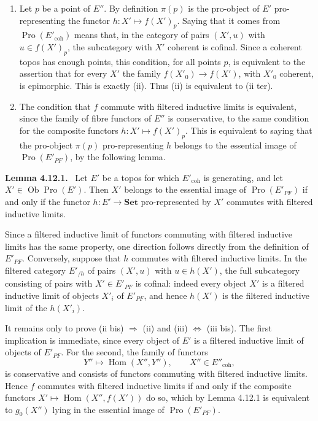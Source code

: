 \documentclass[11pt]{article}
\newcommand{\Ens}{\mathbf{Set}}
\newcommand{\Hom}{\operatorname{Hom}}
\newcommand{\Ob}{\operatorname{Ob}}
\newcommand{\Pro}{\operatorname{Pro}}
\newcommand{\coh}{\mathrm{coh}}
\newenvironment{statement}[1]{\par\medskip\noindent\textbf{#1.}\ }{\par\medskip}
\begin{document}
\begin{enumerate}[label=\alph*)]
\item Let \(p\) be a point of \(E''\). By definition \(\pi(p)\) is the pro-object of \(E'\) pro-representing the functor \(h:X'\mapsto f(X')_p\). Saying that it comes from \(\Pro(E'_{\coh})\) means that, in the category of pairs \((X',u)\) with \(u\in f(X')_p\), the subcategory with \(X'\) coherent is cofinal. Since a coherent topos has enough points, this condition, for all points \(p\), is equivalent to the assertion that for every \(X'\) the family \(f(X'_0)\to f(X')\), with \(X'_0\) coherent, is epimorphic. This is exactly (ii). Thus (ii) is equivalent to (ii ter).

\item The condition that \(f\) commute with filtered inductive limits is equivalent, since the family of fibre functors of \(E''\) is conservative, to the same condition for the composite functors \(h:X'\mapsto f(X')_p\). This is equivalent to saying that the pro-object \(\pi(p)\) pro-representing \(h\) belongs to the essential image of \(\Pro(E'_{PF})\), by the following lemma.
\end{enumerate}

\begin{statement}{Lemma 4.12.1}
Let \(E'\) be a topos for which \(E'_{\coh}\) is generating, and let \(X'\in\Ob\Pro(E')\). Then \(X'\) belongs to the essential image of \(\Pro(E'_{PF})\) if and only if the functor \(h:E'\to\Ens\) pro-represented by \(X'\) commutes with filtered inductive limits.
\end{statement}

Since a filtered inductive limit of functors commuting with filtered inductive limits has the same property, one direction follows directly from the definition of \(E'_{PF}\). Conversely, suppose that \(h\) commutes with filtered inductive limits. In the filtered category \(E'_{/h}\) of pairs \((X',u)\) with \(u\in h(X')\), the full subcategory consisting of pairs with \(X'\in E'_{PF}\) is cofinal: indeed every object \(X'\) is a filtered inductive limit of objects \(X'_i\) of \(E'_{PF}\), and hence \(h(X')\) is the filtered inductive limit of the \(h(X'_i)\).

It remains only to prove (ii bis) \(\Rightarrow\) (ii) and (iii) \(\Leftrightarrow\) (iii bis). The first implication is immediate, since every object of \(E'\) is a filtered inductive limit of objects of \(E'_{PF}\). For the second, the family of functors
\[
  Y''\longmapsto \Hom(X'',Y''),\qquad X''\in {E''}_{\coh},
\]
is conservative and consists of functors commuting with filtered inductive limits. Hence \(f\) commutes with filtered inductive limits if and only if the composite functors \(X'\mapsto \Hom(X'',f(X'))\) do so, which by Lemma 4.12.1 is equivalent to \(g_0(X'')\) lying in the essential image of \(\Pro(E'_{PF})\).
\end{document}
